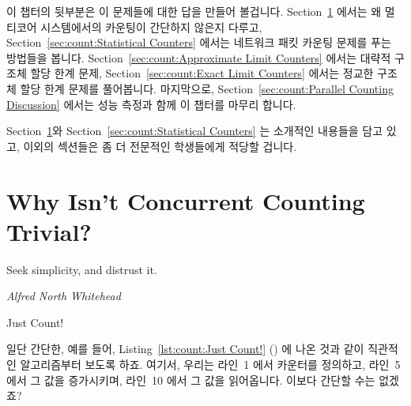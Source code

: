\QuickQuizLabel{\QcountQIOcnt}

이 챕터의 뒷부분은 이 문제들에 대한 답을 만들어 볼겁니다.
Section~\ref{sec:count:Why Isn't Concurrent Counting Trivial?}
에서는 왜 멀티코어 시스템에서의 카운팅이 간단하지 않은지 다루고,
Section~\ref{sec:count:Statistical Counters}
에서는 네트워크 패킷 카운팅 문제를 푸는 방법들을 봅니다.
Section~\ref{sec:count:Approximate Limit Counters}
에서는 대략적 구조체 할당 한계 문제,
Section~\ref{sec:count:Exact Limit Counters}
에서는 정교한 구조체 할당 한계 문제를 풀어봅니다.
마지막으로, Section~\ref{sec:count:Parallel Counting Discussion}
에서는 성능 측정과 함께 이 챕터를 마무리 합니다.

Section~\ref{sec:count:Why Isn't Concurrent Counting Trivial?}와
Section~\ref{sec:count:Statistical Counters} 는 소개적인 내용들을 담고 있고,
이외의 섹션들은 좀 더 전문적인 학생들에게 적당할 겁니다.

\section{Why Isn't Concurrent Counting Trivial?}
\label{sec:count:Why Isn't Concurrent Counting Trivial?}
%
\epigraph{Seek simplicity, and distrust it.}{\emph{Alfred North Whitehead}}

\begin{listing}[tbp]

\caption{Just Count!}
\label{lst:count:Just Count!}
\end{listing}

일단 간단한, 예를 들어,
Listing~\ref{lst:count:Just Count!} ()
에 나온 것과 같이 직관적인 알고리즘부터 보도록 하죠.
여기서, 우리는 라인~1 에서 카운터를 정의하고, 라인~5 에서 그 값을 증가시키며,
라인~10 에서 그 값을 읽어옵니다.
이보다 간단할 수는 없겠죠?

